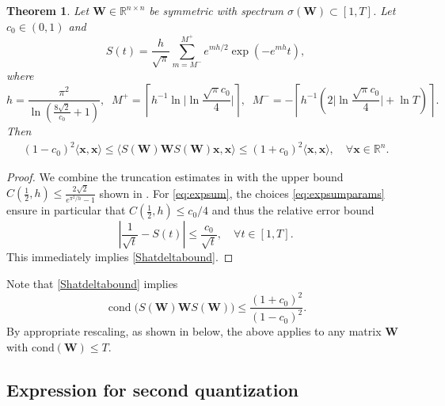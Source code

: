 \documentclass[a4paper,11pt,oneside]{amsart}
\providecommand{\biggabs}[1]{\biggl\lvert#1\biggr\rvert}
\newtheorem{theorem}{Theorem}
\theoremstyle{definition}
\theoremstyle{remark}
\newcommand{\R}{\mathbb{R}}
\newcommand{\ten}[1]{\boldsymbol{#1}}
\numberwithin{equation}{section}
\numberwithin{theorem}{section}
\begin{document}
\begin{theorem}\label{thm:expsum}
Let $\ten W \in \R^{n \times n}$ be symmetric with spectrum $\sigma(\ten W) \subset [1,T]$. Let $c_0 \in (0,1)$ and
\begin{equation}\label{eq:expsum}
  S(t) = \frac{h}{\sqrt{\pi}} \sum_{m = M^-}^{M^+} e^{m h / 2} \exp(-e^{m h} t),
\end{equation}
where
\begin{equation}\label{eq:expsumparams}
%
  h \!=\! \frac{\pi^2}{\ln(\frac{8\sqrt{2}}{c_0} + 1)}, \;\; M^+ = \left\lceil h^{-1} \ln \biggabs{ \ln \frac{\sqrt{\pi} c_0}{4} } \right\rceil, \;\; M^- = -\left\lceil h^{-1}\left( 2 \biggabs{ \ln \frac{\sqrt{\pi} c_0 }4 } + \ln T \right) \right\rceil.
%
\end{equation}
Then 
\begin{align}\label{Shatdeltabound}
  (1-c_0)^2 \langle   \ten x,  \ten x \rangle
   \leq \langle   S(\ten W)  \ten W  S(\ten W) \ten x , \ten x \rangle 	\leq 
   (1 + c_0)^2 \langle  \ten x,  \ten x \rangle, \quad \forall \ten x \in \R^n.
\end{align}
\end{theorem}

\begin{proof}
We combine the truncation estimates in \cite[Corollary 4.3]{B23} with the upper bound $C(\frac12, h) \leq  \frac{2\sqrt{2} }{e^{\pi^2 / h}-1}$ shown in \cite{Scholz_2017}.
For \eqref{eq:expsum}, the choices \eqref{eq:expsumparams}
ensure in particular that $C(\frac{1}{2},h) \leq c_0 / 4$ and thus the relative error bound
\begin{equation}\label{Srelerror}
  \left| \frac{1}{\sqrt{t}} - S(t) \right| \leq \frac{c_0}{\sqrt{t}}, \quad \forall t \in [1,T].
\end{equation}
This immediately implies \eqref{Shatdeltabound}.
\end{proof}


Note that \eqref{Shatdeltabound} implies 
\[  
    \operatorname{cond}\bigl(S(\ten W) \ten W S(\ten W) \bigr) \leq \frac{(1+c_0)^2}{(1-c_0)^2}.
\]   
By appropriate rescaling, as shown in  below, the above applies to any matrix $\ten W$ with $\mathrm{cond}(\ten W) \leq T$.


\subsection{Expression for second quantization}\label{sec:expfsq}

%
%
%
%
%
\end{document}
